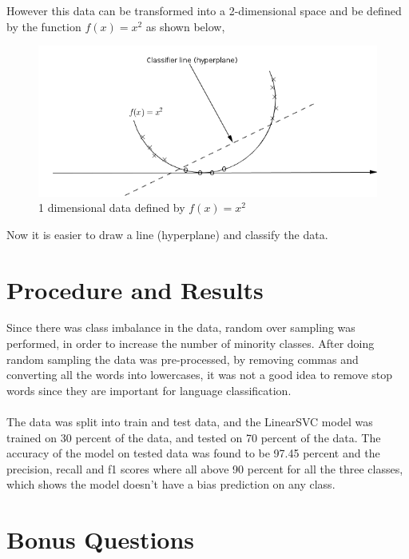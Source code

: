 \documentclass[12pt,a4paper]{article}
\begin{document}
\noindent However this data can be transformed into a 2-dimensional space and be defined by the function $f(x)=x^2$ as shown below,

\begin{figure}[h!]
\label{fig:svm}
\centering
\includegraphics[scale=0.55]{svm_3}
\caption{1 dimensional data defined by $f(x)=x^2$}
\centering
\end{figure}

\noindent Now it is easier to draw a line (hyperplane) and classify the data.

\section{Procedure and Results}

Since there was class imbalance in the data, random over sampling was performed, in order to increase the number of minority classes. After doing random sampling the data was pre-processed, by removing commas and converting all the words into lowercases, it was not a good idea to remove stop words since they are important for language classification.\\
\\
\noindent The data was split into train and test data, and the LinearSVC model was trained on 30 percent of the data, and tested on 70 percent of the data. The accuracy of the model on tested data was found to be 97.45 percent and the precision, recall and f1 scores where all above 90 percent for all the three classes, which shows the model doesn't have a bias prediction on any class.


\section{Bonus Questions}
\end{document}
